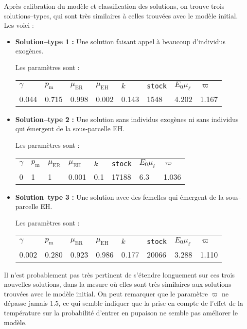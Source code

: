 Après calibration du modèle et classification des solutions, on trouve trois solutions--types, qui sont très similaires à celles trouvées avec le modèle initial.
Les voici :
\begin{itemize}
 \item \textbf{Solution--type 1 :} 
 Une solution faisant appel à beaucoup d'individus exogènes.
 
 Les paramètres sont :
 \begin{center}
\begin{tabular}{llllllll}
$\gamma$ & $p_{\text{m}}$ & $\mu_{\text{ER}}$ & $\mu_{\text{EH}}$ & $k$ & \texttt{stock} & $E_0\mu_{\ell}$ & $\varpi$\\
0.044 & 0.715 & 0.998 & 0.002 & 0.143 & 1548 & 4.202 & 1.167
 \end{tabular}
 \end{center}

\item \textbf{Solution--type 2 :} 
Une solution sans individus exogènes ni sans individus qui émergent de la sous-parcelle EH.

Les paramètres sont :
 \begin{center}
\begin{tabular}{llllllll}
$\gamma$ & $p_{\text{m}}$ & $\mu_{\text{ER}}$ & $\mu_{\text{EH}}$ & $k$ & \texttt{stock} & $E_0\mu_{\ell}$ & $\varpi$\\
0 & 1 & 1 & 0.001 & 0.1 & 17188 & 6.3 & 1.036
 \end{tabular}
 \end{center}
 
\item \textbf{Solution--type 3 :}
Une solution avec des femelles qui émergent de la sous-parcelle EH.

Les paramètres sont :
 \begin{center}
\begin{tabular}{llllllll}
$\gamma$ & $p_{\text{m}}$ & $\mu_{\text{ER}}$ & $\mu_{\text{EH}}$ & $k$ & \texttt{stock} & $E_0\mu_{\ell}$ & $\varpi$\\
0.002 & 0.280 & 0.923 & 0.986 & 0.177 & 20066 & 3.288 & 1.110
 \end{tabular}
 \end{center}
\end{itemize}

Il n'est probablement pas très pertinent de s'étendre longuement sur ces trois nouvelles solutions, dans la mesure où elles sont très similaires aux solutions trouvées avec le modèle initial.
On peut remarquer que le paramètre $\varpi$ ne dépasse jamais 1.5, ce qui semble indiquer que la prise en compte de l'effet de la température sur la probabilité d'entrer en pupaison ne semble pas améliorer le modèle.

